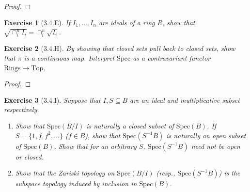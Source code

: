 \documentclass{amsart}
\newtheorem*{exercise*}{Exercise}
\begin{document}
\vspace{0.1in}

\begin{proof}
	
\end{proof}

\vspace{0.1in}


\begin{exercise*}[3.4.E]
    If $I_1, \dots, I_n$ are ideals of a ring $R$, show that $\sqrt{\cap_{i}^nI_i} = \cap_{i}^n \sqrt{I_i}$. 
\end{exercise*}


\begin{exercise*}[3.4.H]
    By showing that closed sets pull back to closed sets, show that $\pi$ is a continuous map. Interpret $\mathrm{Spec}$ as a contravariant functor $\mathrm{Rings}\rightarrow \mathrm{Top}$.
\end{exercise*}

\vspace{0.1in}

\begin{proof}
	
\end{proof}

\vspace{0.1in}


\begin{exercise*}[3.4.I]
    Suppose that $I, S\subseteq B$ are an ideal and multiplicative subset respectively. 
    \begin{enumerate}
        \item[(a)] Show that $\mathrm{Spec}(B/I)$ is naturally a closed subset of $\mathrm{Spec}(B)$. If $S=\{1, f, f^2, \ldots\}$ ($f\in B$), show that $\mathrm{Spec}(S^{-1}B)$ is naturally an open subset of $\mathrm{Spec}(B)$. Show that for an arbitrary $S$, $\mathrm{Spec}(S^{-1}B)$ need not be open or closed. 
        \item[(b)] Show that the Zariski topology on $\mathrm{Spec}(B/I)$ (resp., $\mathrm{Spec}(S^{-1}B)$) is the subspace topology induced by inclusion in $\mathrm{Spec}(B)$.
    \end{enumerate}
\end{exercise*}

\vspace{0.1in}
\end{document}
